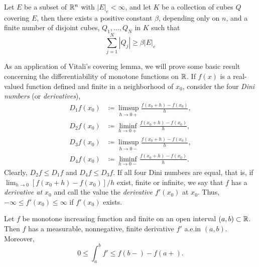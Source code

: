\begin{theorem}
Let $E$ be a subset of $\mathbb{R}^n$ with $|E|_e<\infty$, and let $K$ be a
collection of cubes $Q$ covering $E$, then there exists a positive constant
$\beta$, depending only on $n$, and a finite number of disjoint cubes,
$Q_1,\dotsc,Q_N$ in $K$ such that
\[
\sum_{j=1}^N|Q_j|\geq\beta|E|_e
\]
\end{theorem}

As an application of Vitali's covering lemma, we will prove some basic
result concerning the differentiability of monotone functions on $\mathbb{R}$. If
$f(x)$ is a real-valued function defined and finite in a neighborhood of
$x_0$, consider the four \emph{Dini numbers} (or \emph{derivatives}),
\[
\begin{aligned}
D_1f(x_0)&\coloneqq\limsup_{h\to 0+}\frac{f(x_0+h)-f(x_0)}{h},\\
D_2f(x_0)&\coloneqq\liminf_{h\to 0+}\frac{f(x_0+h)-f(x_0)}{h},\\
D_3f(x_0)&\coloneqq\limsup_{h\to 0-}\frac{f(x_0+h)-f(x_0)}{h},\\
D_4f(x_0)&\coloneqq\liminf_{h\to 0-}\frac{f(x_0+h)-f(x_0)}{h}.
\end{aligned}
\]
Clearly, $D_2f\leq D_1f$ and $D_4f\leq D_3f$. If all four Dini numbers are
equal, that is, if $\lim_{h\to 0}[f(x_0+h)-f(x_0)]/h$ exist, finite or
infinite, we say that $f$ has a \emph{derivative at $x_0$} and call the
value the \emph{derivative $f'(x_0)$} at $x_0$. Thus, $-\infty\leq
f'(x_0)\leq\infty$ if $f'(x_0)$ exists.
\begin{theorem}[7.21]
Let $f$ be monotone increasing function and finite on an open interval
$(a,b)\subset\mathbb{R}$. Then $f$ has a measurable, nonnegative, finite
derivative $f'$ a.e.\@ in $(a,b)$. Moreover,
\[
0\leq\int_a^b f'\leq f(b-)-f(a+).
\]
\end{theorem}
